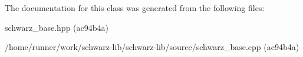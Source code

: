The documentation for this class was generated from the following files\+:\begin{DoxyCompactItemize}
\item 
schwarz\+\_\+base.\+hpp (ac94b4a)\item 
/home/runner/work/schwarz-\/lib/schwarz-\/lib/source/schwarz\+\_\+base.\+cpp (ac94b4a)\end{DoxyCompactItemize}
